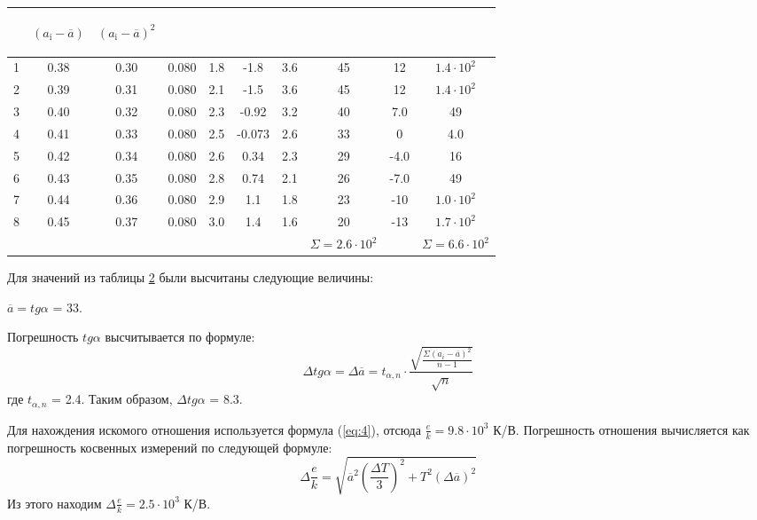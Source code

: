 \begin{center}
\begin{table}[H]
\begin{tabular}{|c|c|c|c|c|c|c|c|c|c|}
\begin{minipage}{25mm}
\end{minipage}&
\begin{minipage}{20mm}
     \begin{center} $(a_{\text{i}}-\overline{a})$ \end{center}
\end{minipage}&
\begin{minipage}{20mm}
     \begin{center} $(a_{\text{i}}-\overline{a})^2$ \end{center}
\end{minipage}\\
\hline
1 & 0.38 & 0.30 & 0.080 & 1.8 & -1.8   & 3.6 & 45 &  12  & $1.4\cdot10^2$ \\
2 & 0.39 & 0.31 & 0.080 & 2.1 & -1.5   & 3.6 & 45 &  12  & $1.4\cdot10^2$ \\
3 & 0.40 & 0.32 & 0.080 & 2.3 & -0.92  & 3.2 & 40 &  7.0 & 49             \\
4 & 0.41 & 0.33 & 0.080 & 2.5 & -0.073 & 2.6 & 33 &  0   & 4.0            \\
5 & 0.42 & 0.34 & 0.080 & 2.6 & 0.34   & 2.3 & 29 & -4.0 & 16             \\
6 & 0.43 & 0.35 & 0.080 & 2.8 & 0.74   & 2.1 & 26 & -7.0 & 49             \\
7 & 0.44 & 0.36 & 0.080 & 2.9 & 1.1    & 1.8 & 23 & -10  & $1.0\cdot10^2$ \\
8 & 0.45 & 0.37 & 0.080 & 3.0 & 1.4    & 1.6 & 20 & -13  & $1.7\cdot10^2$ \\
\hline
 & & & & & & & $\Sigma=2.6\cdot10^2$ & & $\Sigma=6.6\cdot10^2$\\
\hline
\end{tabular}
\end{table}
\end{center}

Для значений из таблицы \hyperref[tabl:3]{2} были высчитаны следующие величины: 

$\overline{a}=tg{\alpha}$ = 33.

Погрешность  $tg{\alpha}$ высчитывается по формуле:
\begin{equation}
\label{eq:6}
    \Delta tg{\alpha}=\Delta\overline{a}=t_{\alpha,n}\cdot\frac{\sqrt{\frac{\Sigma(a_i-\overline{a})^2}{{n-1}}}}{\sqrt{n}}
\end{equation}
где $t_{\alpha,n}$ = 2.4. Таким образом, $\Delta tg{\alpha}$ = 8.3.

Для нахождения искомого отношения используется формула (\ref{eq:4}), отсюда $\frac{e}{k} = 9.8\cdot10^3$ К/В. Погрешность отношения вычисляется как погрешность косвенных измерений по следующей формуле:
\begin{equation}
\label{eq:7}
    \Delta\frac{e}{k}=\sqrt{\overline{a}^2(\frac{\Delta T}{3})^2+T^2(\Delta\overline{a})^2}
\end{equation}
Из этого находим $\Delta\frac{e}{k} = 2.5\cdot10^3$ К/В.

